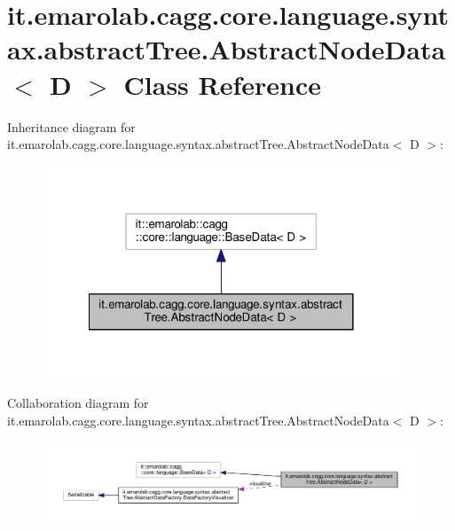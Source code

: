 \hypertarget{classit_1_1emarolab_1_1cagg_1_1core_1_1language_1_1syntax_1_1abstractTree_1_1AbstractNodeData_3_01D_01_4}{\section{it.\-emarolab.\-cagg.\-core.\-language.\-syntax.\-abstract\-Tree.\-Abstract\-Node\-Data$<$ D $>$ Class Reference}
\label{classit_1_1emarolab_1_1cagg_1_1core_1_1language_1_1syntax_1_1abstractTree_1_1AbstractNodeData_3_01D_01_4}
}


Inheritance diagram for it.\-emarolab.\-cagg.\-core.\-language.\-syntax.\-abstract\-Tree.\-Abstract\-Node\-Data$<$ D $>$\-:\nopagebreak
\begin{figure}[H]
\begin{center}
\leavevmode
\includegraphics[width=302pt]{classit_1_1emarolab_1_1cagg_1_1core_1_1language_1_1syntax_1_1abstractTree_1_1AbstractNodeData_3_01D_01_4__inherit__graph}
\end{center}
\end{figure}


Collaboration diagram for it.\-emarolab.\-cagg.\-core.\-language.\-syntax.\-abstract\-Tree.\-Abstract\-Node\-Data$<$ D $>$\-:\nopagebreak
\begin{figure}[H]
\begin{center}
\leavevmode
\includegraphics[width=350pt]{classit_1_1emarolab_1_1cagg_1_1core_1_1language_1_1syntax_1_1abstractTree_1_1AbstractNodeData_3_01D_01_4__coll__graph}
\end{center}
\end{figure}
